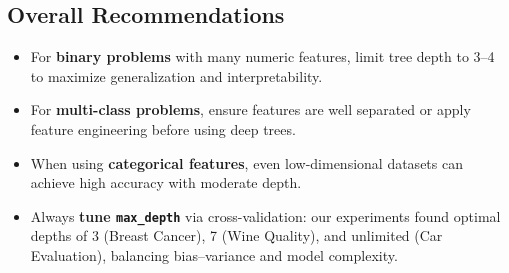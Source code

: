 \subsection{Overall Recommendations}
\begin{itemize}
	\item For \textbf{binary problems} with many numeric features, limit tree depth to 3–4 to maximize generalization and interpretability.
	\item For \textbf{multi-class problems}, ensure features are well separated or apply feature engineering before using deep trees.
	\item When using \textbf{categorical features}, even low-dimensional datasets can achieve high accuracy with moderate depth.
	\item Always \textbf{tune \texttt{max\_depth}} via cross-validation: our experiments found optimal depths of 3 (Breast Cancer), 7 (Wine Quality), and unlimited (Car Evaluation), balancing bias–variance and model complexity.
\end{itemize}
